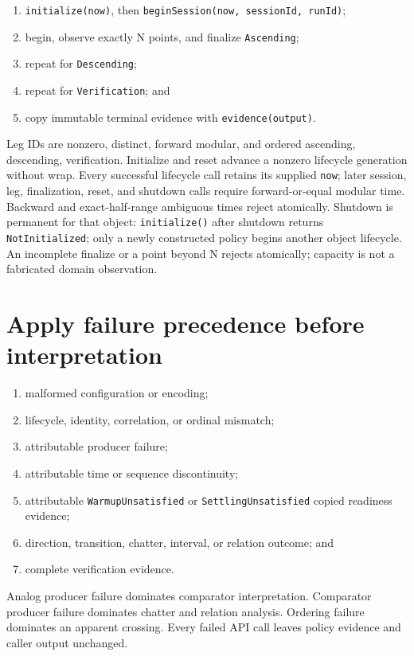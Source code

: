 \documentclass[10pt]{article}
\begin{document}
\begin{enumerate}
 \item \texttt{initialize(now)}, then
       \texttt{beginSession(now, sessionId, runId)};
 \item begin, observe exactly N points, and finalize \texttt{Ascending};
 \item repeat for \texttt{Descending};
 \item repeat for \texttt{Verification}; and
 \item copy immutable terminal evidence with \texttt{evidence(output)}.
\end{enumerate}

Leg IDs are nonzero, distinct, forward modular, and ordered ascending,
descending, verification. Initialize and reset advance a nonzero lifecycle
generation without wrap. Every successful lifecycle call retains its supplied
\texttt{now}; later session, leg, finalization, reset, and shutdown calls
require forward-or-equal modular time. Backward and exact-half-range ambiguous
times reject atomically. Shutdown is permanent for that object:
\texttt{initialize()} after shutdown returns \texttt{NotInitialized}; only a
newly constructed policy begins another object lifecycle. An incomplete
finalize or a point beyond N rejects atomically; capacity is not a fabricated
domain observation.

\section{Apply failure precedence before interpretation}
\begin{enumerate}
 \item malformed configuration or encoding;
 \item lifecycle, identity, correlation, or ordinal mismatch;
 \item attributable producer failure;
 \item attributable time or sequence discontinuity;
 \item attributable \texttt{WarmupUnsatisfied} or
       \texttt{SettlingUnsatisfied} copied readiness evidence;
 \item direction, transition, chatter, interval, or relation outcome; and
 \item complete verification evidence.
\end{enumerate}

Analog producer failure dominates comparator interpretation. Comparator
producer failure dominates chatter and relation analysis. Ordering failure
dominates an apparent crossing. Every failed API call leaves policy evidence
and caller output unchanged.
\end{document}
